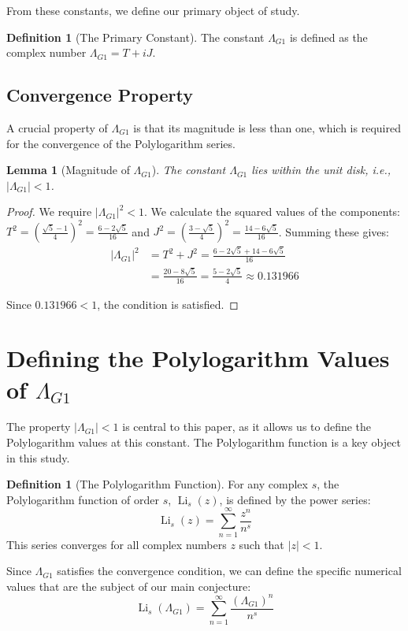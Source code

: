 \documentclass{amsart}
\theoremstyle{plain}
\newtheorem{lemma}[theorem]{Lemma}
\theoremstyle{definition}
\newtheorem{definition}[theorem]{Definition}
\theoremstyle{remark}
\DeclareMathOperator{\Li}{Li} %
\newcommand{\LambdaG}{\Lambda_{G1}}
\begin{document}
From these constants, we define our primary object of study.
\begin{definition}[The Primary Constant]
The constant $\LambdaG$ is defined as the complex number $\LambdaG = T+iJ$.
\end{definition}

\subsection{Convergence Property}
A crucial property of $\LambdaG$ is that its magnitude is less than one, which is required for the convergence of the Polylogarithm series.
\begin{lemma}[Magnitude of $\LambdaG$]
\label{lem:convergence}
The constant $\LambdaG$ lies within the unit disk, i.e., $|\LambdaG| < 1$.
\end{lemma}
\begin{proof}
We require $|\LambdaG|^2 < 1$.
We calculate the squared values of the components: $T^2 = \left(\frac{\sqrt{5}-1}{4}\right)^2 = \frac{6-2\sqrt{5}}{16}$ and $J^2 = \left(\frac{3-\sqrt{5}}{4}\right)^2 = \frac{14-6\sqrt{5}}{16}$.
Summing these gives:
\begin{align*}
    |\LambdaG|^2 &= T^2+J^2 = \frac{6-2\sqrt{5} + 14-6\sqrt{5}}{16} \\
                 &= \frac{20-8\sqrt{5}}{16} = \frac{5-2\sqrt{5}}{4} \approx 0.131966
\end{align*}

Since $0.131966 < 1$, the condition is satisfied.
\qedhere
\end{proof}

\section{Defining the Polylogarithm Values of \texorpdfstring{$\LambdaG$}{Lambda\_G1}}
The property $|\LambdaG| < 1$ is central to this paper, as it allows us to define the Polylogarithm values at this constant.
The Polylogarithm function is a key object in this study.
\begin{definition}[The Polylogarithm Function]
For any complex $s$, the Polylogarithm function of order $s$, $\Li_s(z)$, is defined by the power series:
$$ \Li_s(z) = \sum_{n=1}^{\infty} \frac{z^n}{n^s} $$
This series converges for all complex numbers $z$ such that $|z|<1$.
\end{definition}

Since $\LambdaG$ satisfies the convergence condition, we can define the specific numerical values that are the subject of our main conjecture:
$$ \Li_s(\LambdaG) = \sum_{n=1}^{\infty} \frac{(\LambdaG)^{n}}{n^s} $$
\end{document}
